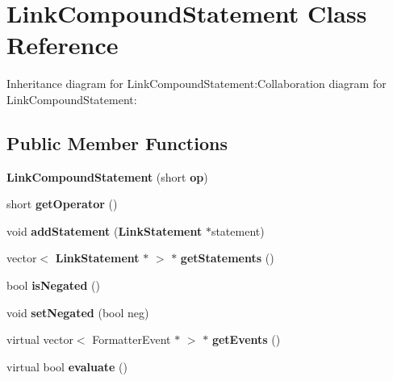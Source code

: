 \section{LinkCompoundStatement Class Reference}
\label{classbr_1_1pucrio_1_1telemidia_1_1ginga_1_1ncl_1_1model_1_1link_1_1LinkCompoundStatement}
Inheritance diagram for LinkCompoundStatement:Collaboration diagram for LinkCompoundStatement:\subsection*{Public Member Functions}
\begin{CompactItemize}
\item 
\textbf{LinkCompoundStatement} (short {\bf op})\label{classbr_1_1pucrio_1_1telemidia_1_1ginga_1_1ncl_1_1model_1_1link_1_1LinkCompoundStatement_bc48ce36cc8c1a7ffc3efe40883f3bc4}

\item 
short \textbf{getOperator} ()\label{classbr_1_1pucrio_1_1telemidia_1_1ginga_1_1ncl_1_1model_1_1link_1_1LinkCompoundStatement_1303a32e05e883b65d250ca25fa871ad}

\item 
void \textbf{addStatement} ({\bf LinkStatement} $\ast$statement)\label{classbr_1_1pucrio_1_1telemidia_1_1ginga_1_1ncl_1_1model_1_1link_1_1LinkCompoundStatement_3a5335dd72b94ec687955aa87a5c1de0}

\item 
vector$<$ {\bf LinkStatement} $\ast$ $>$ $\ast$ \textbf{getStatements} ()\label{classbr_1_1pucrio_1_1telemidia_1_1ginga_1_1ncl_1_1model_1_1link_1_1LinkCompoundStatement_6ad8359aa46f97ef495b895d731e6bf1}

\item 
bool \textbf{isNegated} ()\label{classbr_1_1pucrio_1_1telemidia_1_1ginga_1_1ncl_1_1model_1_1link_1_1LinkCompoundStatement_7378901ff602df436f564710c6ff8f3d}

\item 
void \textbf{setNegated} (bool neg)\label{classbr_1_1pucrio_1_1telemidia_1_1ginga_1_1ncl_1_1model_1_1link_1_1LinkCompoundStatement_0590e69a5d79cec10399a5f783d1c49e}

\item 
virtual vector$<$ FormatterEvent $\ast$ $>$ $\ast$ \textbf{getEvents} ()\label{classbr_1_1pucrio_1_1telemidia_1_1ginga_1_1ncl_1_1model_1_1link_1_1LinkCompoundStatement_77d29bf7857d5b09d0ef4fb69cfc31cd}

\item 
virtual bool \textbf{evaluate} ()\label{classbr_1_1pucrio_1_1telemidia_1_1ginga_1_1ncl_1_1model_1_1link_1_1LinkCompoundStatement_b3e1146e41a1f8028564611511a09420}

\end{CompactItemize}
